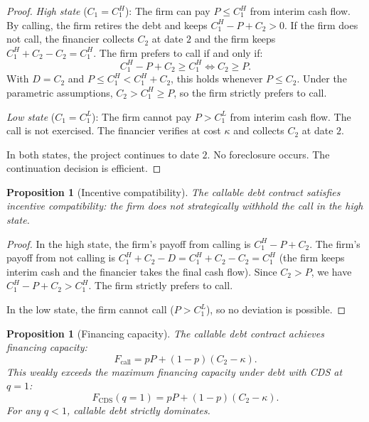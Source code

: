 \documentclass[12pt,a4paper]{article}
\theoremstyle{plain}
\newtheorem{proposition}[theorem]{Proposition}
\theoremstyle{definition}
\theoremstyle{remark}
\begin{document}
\begin{proof}
\textit{High state} ($C_1 = C_1^H$): The firm can pay $P \leq C_1^H$ from interim cash flow. By calling, the firm retires the debt and keeps $C_1^H - P + C_2 > 0$. If the firm does not call, the financier collects $C_2$ at date $2$ and the firm keeps $C_1^H + C_2 - C_2 = C_1^H$. The firm prefers to call if and only if:
\[
C_1^H - P + C_2 \geq C_1^H \iff C_2 \geq P.
\]
With $D = C_2$ and $P \leq C_1^H < C_1^H + C_2$, this holds whenever $P \leq C_2$. Under the parametric assumptions, $C_2 > C_1^H \geq P$, so the firm strictly prefers to call.

\textit{Low state} ($C_1 = C_1^L$): The firm cannot pay $P > C_1^L$ from interim cash flow. The call is not exercised. The financier verifies at cost $\kappa$ and collects $C_2$ at date $2$.

In both states, the project continues to date $2$. No foreclosure occurs. The continuation decision is efficient.
\end{proof}

\begin{proposition}[Incentive compatibility]\label{p:ic}
The callable debt contract satisfies incentive compatibility: the firm does not strategically withhold the call in the high state.
\end{proposition}

\begin{proof}
In the high state, the firm's payoff from calling is $C_1^H - P + C_2$. The firm's payoff from not calling is $C_1^H + C_2 - D = C_1^H + C_2 - C_2 = C_1^H$ (the firm keeps interim cash and the financier takes the final cash flow). Since $C_2 > P$, we have $C_1^H - P + C_2 > C_1^H$. The firm strictly prefers to call.

In the low state, the firm cannot call ($P > C_1^L$), so no deviation is possible.
\end{proof}

\begin{proposition}[Financing capacity]\label{p:finance}
The callable debt contract achieves financing capacity:
\begin{equation}\label{eq:fincap}
F_{\text{call}} = pP + (1-p)(C_2 - \kappa).
\end{equation}
This weakly exceeds the maximum financing capacity under debt with CDS at $q = 1$:
\begin{equation}\label{eq:fincds}
F_{\text{CDS}}(q=1) = pP + (1-p)(C_2 - \kappa).
\end{equation}
For any $q < 1$, callable debt strictly dominates.
\end{proposition}
\end{document}
